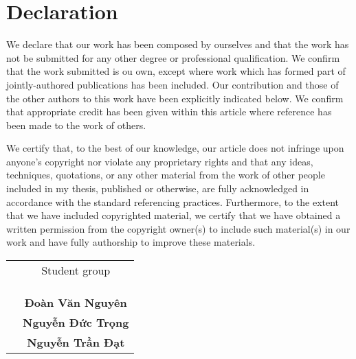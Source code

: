 \chapter*{Declaration}
We declare that our work has been composed by ourselves and that the work has not be submitted for any other degree or professional qualification.
We confirm that the work submitted is ou own, except where work which has formed part of jointly-authored publications has been included.
Our contribution and those of the other authors to this work have been explicitly indicated below.
We confirm that appropriate credit has been given within this article where reference has been made to the work of others.


We certify that, to the best of our knowledge, our article does not infringe upon anyone’s copyright nor violate any proprietary rights and that any ideas, techniques, quotations, or any other material from the work of other people included in my thesis, published or otherwise, are fully acknowledged in accordance with the standard referencing practices.
Furthermore, to the extent that we have included copyrighted material, we certify that we have obtained a written permission from the copyright owner(s) to include such material(s) in our work and have fully authorship to improve these materials.

\begin{table}[h]
\begin{tabular}{p{}c}
 & Student group \\
 &              \\
 &              \\
 &              \\
 & \textbf{Đoàn Văn Nguyên}\\
 & \textbf{Nguyễn Đức Trọng}\\
 & \textbf{Nguyễn Trần Đạt}
\end{tabular}
\end{table}